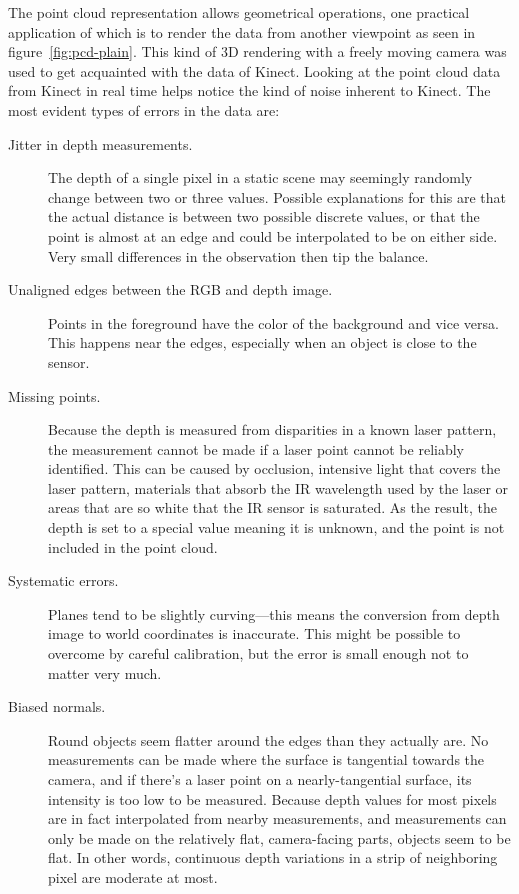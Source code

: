 The point cloud representation allows geometrical operations, one practical application of which is to render the data from another viewpoint as seen in figure~\ref{fig:pcd-plain}. This kind of 3D rendering with a freely moving camera was used to get acquainted with the data of Kinect. Looking at the point cloud data from Kinect in real time helps notice the kind of noise inherent to Kinect. The most evident types of errors in the data are:
%
\begin{description}
    \item[Jitter in depth measurements.] The depth of a single pixel in a static scene may seemingly randomly change between two or three values. Possible explanations for this are that the actual distance is between two possible discrete values, or that the point is almost at an edge and could be interpolated to be on either side. Very small differences in the observation then tip the balance.
    \item[Unaligned edges between the RGB and depth image.] Points in the foreground have the color of the background and vice versa. This happens near the edges, especially when an object is close to the sensor.
    \item[Missing points.] Because the depth is measured from disparities in a known laser pattern, the measurement cannot be made if a laser point cannot be reliably identified. This can be caused by occlusion, intensive light that covers the laser pattern, materials that absorb the IR wavelength used by the laser or areas that are so white that the IR sensor is saturated. As the result, the depth is set to a special value meaning it is unknown, and the point is not included in the point cloud.
    \item[Systematic errors.] Planes tend to be slightly curving---this means the conversion from depth image to world coordinates is inaccurate. This might be possible to overcome by careful calibration, but the error is small enough not to matter very much.
    \item[Biased normals.] Round objects seem flatter around the edges than they actually are. No measurements can be made where the surface is tangential towards the camera, and if there's a laser point on a nearly-tangential surface, its intensity is too low to be measured. Because depth values for most pixels are in fact interpolated from nearby measurements, and measurements can only be made on the relatively flat, camera-facing parts, objects seem to be flat. In other words, continuous depth variations in a strip of neighboring pixel are moderate at most.
\end{description}


